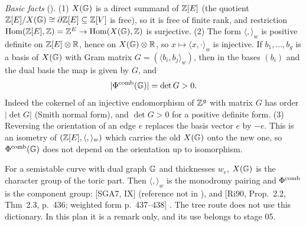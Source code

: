 \noindent\emph{Basic facts} (\stproved). (1) $X(\mathbb{G})$ is a direct summand of $\mathbb{Z}[E]$ (the quotient $\mathbb{Z}[E]/X(\mathbb{G})\cong\partial\mathbb{Z}[E]\subseteq\mathbb{Z}[V]$
is free), so it is free of finite rank, and restriction $\operatorname{Hom}(\mathbb{Z}[E],\mathbb{Z})=\mathbb{Z}^E\to\operatorname{Hom}(X(\mathbb{G}),\mathbb{Z})$ is surjective. (2) The form
$\langle,\rangle_w$ is positive definite on $\mathbb{Z}[E]\otimes\mathbb{R}$, hence on $X(\mathbb{G})\otimes\mathbb{R}$, so $x\mapsto\langle x,\cdot\rangle_w$ is injective. If
$b_1,\dots,b_g$ is a basis of $X(\mathbb{G})$ with Gram matrix $G=(\langle b_i,b_j\rangle_w)$, then in the bases $(b_i)$ and the dual basis the map is
given by $G$, and
\[|\Phi^{\mathrm{comb}}(\mathbb{G})|=\det G>0 .\]
Indeed the cokernel of an injective endomorphism of $\mathbb{Z}^g$ with matrix $G$ has order $|\det G|$ (Smith normal form), and $\det G>0$ for a
positive definite form. (3) Reversing the orientation of an edge $e$ replaces the basis vector $e$ by $-e$. This is an isometry of
$(\mathbb{Z}[E],\langle,\rangle_w)$ which carries the old $X(\mathbb{G})$ onto the new one, so $\Phi^{\mathrm{comb}}(\mathbb{G})$ does not depend on the orientation up to
isomorphism.

\begin{remark}\label{rem:s03-grothendieck}
For a semistable curve with dual graph $\mathbb{G}$ and thicknesses $w_e$, $X(\mathbb{G})$ is the character group of the toric part. Then
$\langle,\rangle_w$ is the monodromy pairing and $\Phi^{\mathrm{comb}}$ is the component group: [SGA7, IX] \stcited{} (reference not in
), and [Ri90, Prop.~2.2, Thm~2.3, p.~436; weighted form p.~437--438]
. The tree route does not use this dictionary. In this plan it is a remark only, and its use belongs to stage 05.
\end{remark}


